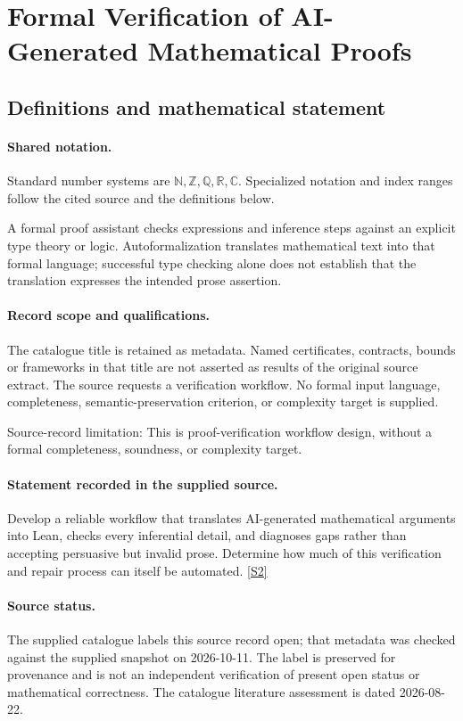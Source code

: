 \documentclass[11pt]{article}
\newcommand{\sref}[2]{\hyperlink{source:#1:#2}{[S#2]}}
\begin{document}
\section{Formal Verification of AI-Generated Mathematical Proofs}\label{statement}

\subsection{Definitions and mathematical statement}

\paragraph{Shared notation.}Standard number systems are $\mathbb N,\mathbb Z,\mathbb Q,\mathbb R,\mathbb C$. Specialized notation and index ranges follow the cited source and the definitions below.


A formal proof assistant checks expressions and inference steps against an explicit type theory or logic. Autoformalization translates mathematical text into that formal language; successful type checking alone does not establish that the translation expresses the intended prose assertion.
\paragraph{Record scope and qualifications.}
The catalogue title is retained as metadata. Named certificates, contracts, bounds or frameworks in that title are not asserted as results of the original source extract.
The source requests a verification workflow. No formal input language, completeness, semantic-preservation criterion, or complexity target is supplied.

Source-record limitation: This is proof-verification workflow design, without a formal completeness, soundness, or complexity target.
\paragraph{Statement recorded in the supplied source.}
Develop a reliable workflow that translates AI-generated mathematical arguments into Lean, checks every inferential detail, and diagnoses gaps rather than accepting persuasive but invalid prose. Determine how much of this verification and repair process can itself be automated. \sref{statement}{2}
\paragraph{Source status.}
The supplied catalogue labels this source record open; that metadata was checked against the supplied snapshot on 2026-10-11. The label is preserved for provenance and is not an independent verification of present open status or mathematical correctness. The catalogue literature assessment is dated 2026-08-22.
\end{document}
